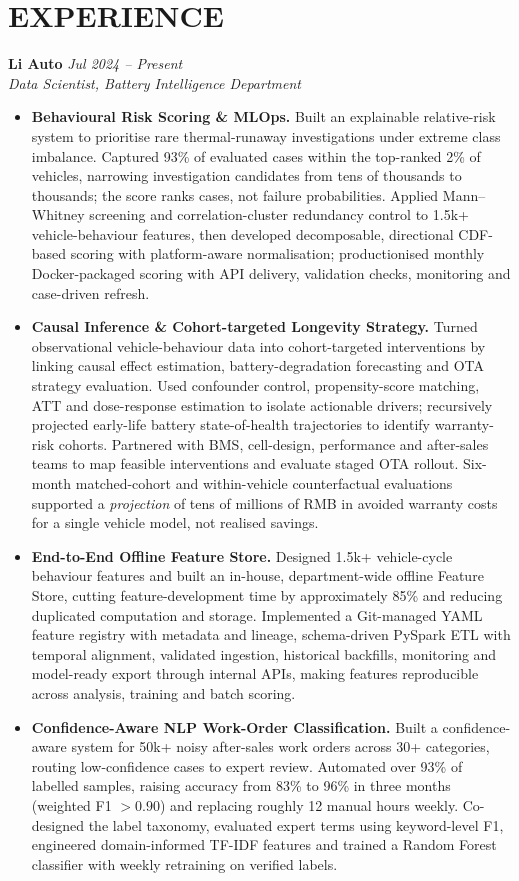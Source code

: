 \documentclass[a4paper,10pt]{article}
\begin{document}
\section{EXPERIENCE}
\textbf{Li Auto} \hfill \textit{Jul 2024 -- Present}\\
\textit{Data Scientist, Battery Intelligence Department}
\begin{itemize}
\item \textbf{Behavioural Risk Scoring \& MLOps.} Built an explainable relative-risk system to prioritise rare thermal-runaway investigations under extreme class imbalance. Captured 93\% of evaluated cases within the top-ranked 2\% of vehicles, narrowing investigation candidates from tens of thousands to thousands; the score ranks cases, not failure probabilities. Applied Mann--Whitney screening and correlation-cluster redundancy control to 1.5k+ vehicle-behaviour features, then developed decomposable, directional CDF-based scoring with platform-aware normalisation; productionised monthly Docker-packaged scoring with API delivery, validation checks, monitoring and case-driven refresh.
\item \textbf{Causal Inference \& Cohort-targeted Longevity Strategy.} Turned observational vehicle-behaviour data into cohort-targeted interventions by linking causal effect estimation, battery-degradation forecasting and OTA strategy evaluation. Used confounder control, propensity-score matching, ATT and dose-response estimation to isolate actionable drivers; recursively projected early-life battery state-of-health trajectories to identify warranty-risk cohorts. Partnered with BMS, cell-design, performance and after-sales teams to map feasible interventions and evaluate staged OTA rollout. Six-month matched-cohort and within-vehicle counterfactual evaluations supported a \emph{projection} of tens of millions of RMB in avoided warranty costs for a single vehicle model, not realised savings.
\item \textbf{End-to-End Offline Feature Store.} Designed 1.5k+ vehicle-cycle behaviour features and built an in-house, department-wide offline Feature Store, cutting feature-development time by approximately 85\% and reducing duplicated computation and storage. Implemented a Git-managed YAML feature registry with metadata and lineage, schema-driven PySpark ETL with temporal alignment, validated ingestion, historical backfills, monitoring and model-ready export through internal APIs, making features reproducible across analysis, training and batch scoring.
\item \textbf{Confidence-Aware NLP Work-Order Classification.} Built a confidence-aware system for 50k+ noisy after-sales work orders across 30+ categories, routing low-confidence cases to expert review. Automated over 93\% of labelled samples, raising accuracy from 83\% to 96\% in three months (weighted F1 $>0.90$) and replacing roughly 12 manual hours weekly. Co-designed the label taxonomy, evaluated expert terms using keyword-level F1, engineered domain-informed TF-IDF features and trained a Random Forest classifier with weekly retraining on verified labels.
\end{itemize}
\end{document}
